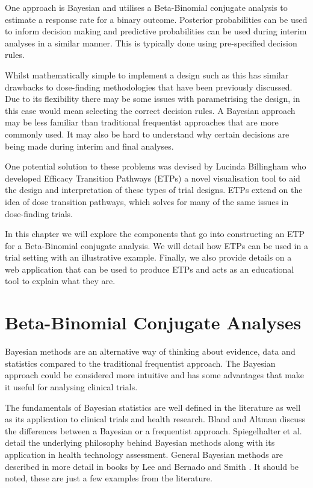 One approach is Bayesian and utilises a Beta-Binomial conjugate analysis to estimate a  response rate for a binary outcome. Posterior probabilities can be used to inform decision making and predictive probabilities can be used during interim analyses in a similar manner. This is typically done using pre-specified decision rules.

Whilst mathematically simple to implement a design such as this has similar drawbacks to dose-finding methodologies that have been previously discussed. Due to its flexibility there may be some issues with parametrising the design, in this case would mean selecting the correct decision rules. A Bayesian approach may be less familiar than traditional frequentist approaches that are more commonly used. It may also be hard to understand why certain decisions are being made during interim and final analyses.  

One potential solution to these problems was devised by Lucinda Billingham who developed Efficacy Transition Pathways (ETPs) a novel visualisation tool to aid the design and interpretation of these types of trial designs. ETPs extend on the idea of dose transition pathways, which solves for many of the same issues in dose-finding trials. 

In this chapter we will explore the components that go into constructing an ETP for a Beta-Binomial conjugate analysis. We will detail how ETPs can be used in a trial setting with an illustrative example. Finally, we also provide details on a web application that can be used to produce ETPs and acts as an educational tool to explain what they are. 


\section{Beta-Binomial Conjugate Analyses}

Bayesian methods are an alternative way of thinking about evidence, data and statistics compared to the traditional frequentist approach. The Bayesian approach could be considered more intuitive and has some advantages that make it useful for analysing clinical trials. 

The fundamentals of Bayesian statistics are well defined in the literature as well as its application to clinical trials and health research. Bland and Altman \cite{blandBayesiansFrequentists1998} discuss the differences between a Bayesian or a frequentist approach. Spiegelhalter et al. \cite{spiegelhalterIntroductionBayesianMethods1999} detail the underlying philosophy behind Bayesian methods along with its application in health technology assessment. General Bayesian methods are described in more detail in books by Lee \cite{leeBayesianStatisticsIntroduction2012} and Bernado and Smith \cite{bernardoBayesianTheory2009}. It should be noted, these are just a few examples from the literature.    

